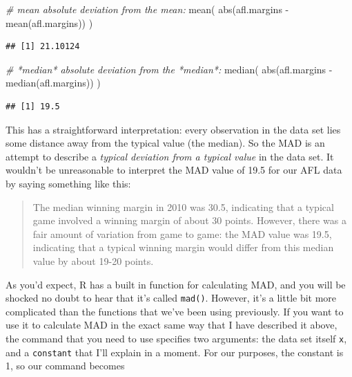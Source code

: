 \documentclass[
]{book}
\newenvironment{Shaded}{\begin{snugshade}}{\end{snugshade}}
\newcommand{\CommentTok}[1]{\textcolor[rgb]{0.56,0.35,0.01}{\textit{#1}}}
\newcommand{\FunctionTok}[1]{\textcolor[rgb]{0.00,0.00,0.00}{#1}}
\newcommand{\NormalTok}[1]{#1}
\newcommand{\SpecialCharTok}[1]{\textcolor[rgb]{0.00,0.00,0.00}{#1}}
\begin{document}
\begin{Shaded}
\begin{Highlighting}[]
\CommentTok{\# mean absolute deviation from the mean:}
\FunctionTok{mean}\NormalTok{( }\FunctionTok{abs}\NormalTok{(afl.margins }\SpecialCharTok{{-}} \FunctionTok{mean}\NormalTok{(afl.margins)) )}
\end{Highlighting}
\end{Shaded}

\begin{verbatim}
## [1] 21.10124
\end{verbatim}

\begin{Shaded}
\begin{Highlighting}[]
\CommentTok{\# *median* absolute deviation from the *median*:}
\FunctionTok{median}\NormalTok{( }\FunctionTok{abs}\NormalTok{(afl.margins }\SpecialCharTok{{-}} \FunctionTok{median}\NormalTok{(afl.margins)) )}
\end{Highlighting}
\end{Shaded}

\begin{verbatim}
## [1] 19.5
\end{verbatim}

This has a straightforward interpretation: every observation in the data set lies some distance away from the typical value (the median). So the MAD is an attempt to describe a \emph{typical deviation from a typical value} in the data set. It wouldn't be unreasonable to interpret the MAD value of 19.5 for our AFL data by saying something like this:

\begin{quote}
The median winning margin in 2010 was 30.5, indicating that a typical game involved a winning margin of about 30 points. However, there was a fair amount of variation from game to game: the MAD value was 19.5, indicating that a typical winning margin would differ from this median value by about 19-20 points.
\end{quote}

As you'd expect, R has a built in function for calculating MAD, and you will be shocked no doubt to hear that it's called \texttt{mad()}. However, it's a little bit more complicated than the functions that we've been using previously. If you want to use it to calculate MAD in the exact same way that I have described it above, the command that you need to use specifies two arguments: the data set itself \texttt{x}, and a \texttt{constant} that I'll explain in a moment. For our purposes, the constant is 1, so our command becomes
\end{document}

